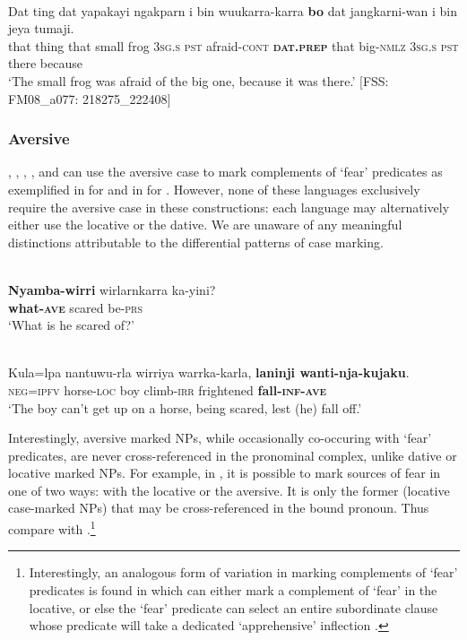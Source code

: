 \documentclass[output=paper,colorlinks,citecolor=brown]{langscibook}
\begin{document}
\ea 
{} \\
\gll Dat ting dat yapakayi ngakparn i bin wuukarra-karra \textbf{bo} dat jangkarni-wan i bin jeya tumaji. \\
that thing that small frog \textsc{3sg.s} \textsc{pst} afraid-\textsc{cont} \textbf{\textsc{dat.prep}} that big-\textsc{nmlz} \textsc{3sg.s} \textsc{pst} there because \\
\glt `The small frog was afraid of the big one, because it was there.' $[$FSS: FM08\_a077: 218275\_222408$]$
\label{ex:bro39}
\z



\subsubsection{Aversive}
\label{subsubsec:aversive}

, , , , and  can use the aversive case to mark complements of `fear' predicates as exemplified in  for  and in  for . However, none of these languages exclusively require the aversive case in these constructions: each language may alternatively either use the locative or the dative. We are unaware of any meaningful distinctions attributable to the differential patterns of case marking.

\ea 
{} \\
\gll \textbf{Nyamba-wirri} wirlarnkarra ka-yini? \\
\textbf{what-\textsc{ave}} scared be-\textsc{prs} \\
\glt `What is he scared of?' 
\label{ex:bro40}
\z

\ea 
{} \\
\gll Kula=lpa nantuwu-rla wirriya warrka-karla, \textbf{laninji wanti-nja-kujaku}. \\
\textsc{neg=ipfv} horse-\textsc{loc} boy climb-\textsc{irr} frightened \textbf{fall-\textsc{inf-ave}} \\
\glt `The boy can't get up on a horse, being scared, lest (he) fall off.'
\label{ex:bro41}
\z

 Interestingly, aversive marked NPs, while occasionally co-occuring with `fear' predicates, are never cross-referenced in the pronominal complex, unlike dative or locative marked NPs. For example, in , it is possible to mark sources of fear in one of two ways: with the locative or the aversive. It is only the former (locative case-marked NPs) that may be cross-referenced in the bound pronoun. Thus compare  with .\footnote{Interestingly, an analogous form of variation in marking complements of `fear' predicates is found in  which can either mark a complement of `fear' in the locative, or else the `fear' predicate can select an entire subordinate clause whose predicate will take a dedicated `apprehensive' inflection \citep[619]{tsunoda_grammar_2011}.}
\end{document}

